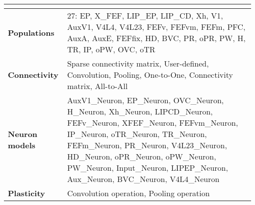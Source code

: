 \documentclass{article}
\newcommand{\hdr}[3]{
    \multicolumn{#1}{|l|}{
        \color{white}\cellcolor[gray]{0.0}
        \textbf{\makebox[0pt]{#2}\hspace{0.5\linewidth}\makebox[0pt][c]{#3}}
    }
}
\begin{document}
\rmfamily

\noindent
\begin{tabularx}{\linewidth}{|l|X|}\hline
\hdr{2}{A}{Model Summary}\\ \hline
\textbf{Populations}     & 27: EP, X\_FEF, LIP\_EP, LIP\_CD, Xh, V1, AuxV1, V4L4, V4L23, FEFv, FEFvm, FEFm, PFC, AuxA, AuxE, FEFfix, HD, BVC, PR, oPR, PW, H, TR, IP, oPW, OVC, oTR \\ \hline
\textbf{Connectivity}    & Sparse connectivity matrix, User-defined, Convolution, Pooling, One-to-One, Connectivity matrix, All-to-All \\ \hline
\textbf{Neuron models}   & AuxV1\_Neuron, EP\_Neuron, OVC\_Neuron, H\_Neuron, Xh\_Neuron, LIPCD\_Neuron, FEFv\_Neuron, XFEF\_Neuron, FEFvm\_Neuron, IP\_Neuron, oTR\_Neuron, TR\_Neuron, FEFm\_Neuron, PR\_Neuron, V4L23\_Neuron, HD\_Neuron, oPR\_Neuron, oPW\_Neuron, PW\_Neuron, Input\_Neuron, LIPEP\_Neuron, Aux\_Neuron, BVC\_Neuron, V4L4\_Neuron \\ \hline
\textbf{Plasticity}      & Convolution operation, Pooling operation\\ \hline
\end{tabularx}

\vspace{2ex}
\end{document}
